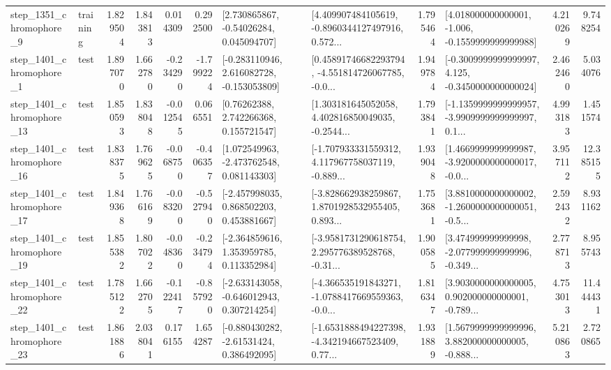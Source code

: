 \begin{tabular}{llrrrrllrlrr}
  step\_1351\_chromophore\_9 &  training &      1.829504 &    1.843813 &      0.014309 &  0.292500 &     [2.730865867, -0.54026284, 0.045094707] &  [4.409907484105619, -0.8960344127497916, 0.572... &       1.795464 &   [4.018000000000001, -1.006, -0.1559999999999988] &            4.210269 &          9.748254 \\
  step\_1401\_chromophore\_1 &      test &      1.897070 &    1.662780 &     -0.234290 & -1.799224 &   [-0.283110946, 2.616082728, -0.153053809] &  [0.45891746682293794, -4.551814726067785, -0.0... &       1.949784 &  [-0.3009999999999997, 4.125, -0.3450000000000024] &            2.462460 &          5.034076 \\
 step\_1401\_chromophore\_13 &      test &      1.850593 &    1.838048 &     -0.012545 &  0.066551 &      [0.76262388, 2.742266368, 0.155721547] &  [1.303181645052058, 4.402816850049035, -0.2544... &       1.793841 &  [-1.1359999999999957, -3.9909999999999997, 0.1... &            4.993183 &          1.451574 \\
 step\_1401\_chromophore\_16 &      test &      1.838375 &    1.769625 &     -0.068750 & -0.406357 &    [1.072549963, -2.473762548, 0.081143303] &  [-1.707933331559312, 4.117967758037119, -0.889... &       1.939048 &  [1.4669999999999987, -3.9200000000000017, -0.0... &            3.957112 &         12.385155 \\
 step\_1401\_chromophore\_17 &      test &      1.849368 &    1.766169 &     -0.083200 & -0.527940 &    [-2.457998035, 0.868502203, 0.453881667] &  [-3.828662938259867, 1.8701928532955405, 0.893... &       1.753681 &  [3.8810000000000002, -1.2600000000000051, -0.5... &            2.592432 &          8.931162 \\
 step\_1401\_chromophore\_19 &      test &      1.855382 &    1.807022 &     -0.048360 & -0.234794 &    [-2.364859616, 1.353959785, 0.113352984] &  [-3.9581731290618754, 2.295776389528768, -0.31... &       1.900585 &  [3.474999999999998, -2.077999999999996, -0.349... &            2.778713 &          8.955743 \\
 step\_1401\_chromophore\_22 &      test &      1.785122 &    1.662705 &     -0.122417 & -0.857920 &   [-2.633143058, -0.646012943, 0.307214254] &  [-4.366535191843271, -1.0788417669559363, -0.0... &       1.816347 &  [3.9030000000000005, 0.902000000000001, -0.789... &            4.753013 &         11.444431 \\
 step\_1401\_chromophore\_23 &      test &      1.861886 &    2.038041 &      0.176155 &  1.654287 &    [-0.880430282, -2.61531424, 0.386492095] &  [-1.6531888494227398, -4.342194667523409, 0.77... &       1.931889 &  [1.5679999999999996, 3.882000000000005, -0.888... &            5.210863 &          2.720865 \\

\end{tabular}
